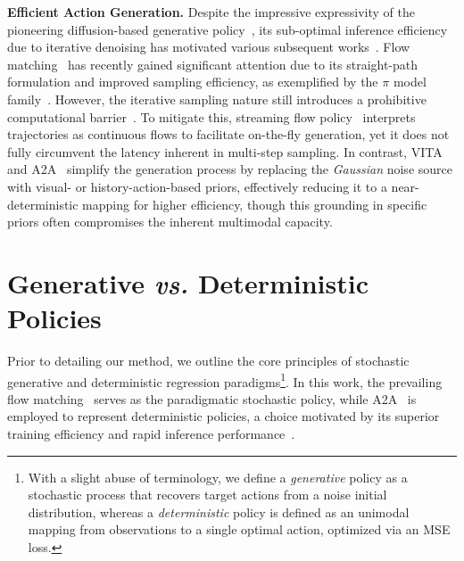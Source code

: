 \textbf{Efficient Action Generation.}
Despite the impressive expressivity of the pioneering diffusion-based generative policy~\citep{dp}, its sub-optimal inference efficiency due to iterative denoising has motivated various subsequent works~\citep{gao2025vita, jia2026action, bai2026flash}. Flow matching~\citep{flowmatching, zhang2025flowpolicy, fang2025omp, li2026ofp} has recently gained significant attention due to its straight-path formulation and improved sampling efficiency, as exemplified by the $\pi$ model family~\citep{intelligence2025pi,intelligence2025pi05, black2024pi_0}. However, the iterative sampling nature still introduces a prohibitive computational barrier~\citep{dp, pan2025much}. To mitigate this, streaming flow policy~\citep{jiang2025streaming} interprets trajectories as continuous flows to facilitate on-the-fly generation, yet it does not fully circumvent the latency inherent in multi-step sampling. In contrast, VITA~\citep{gao2025vita} and A2A~\citep{jia2026action} simplify the generation process by replacing the \textit{Gaussian} noise source with visual- or history-action-based priors, effectively reducing it to a near-deterministic mapping for higher efficiency, though this grounding in specific priors often compromises the inherent multimodal capacity.




\section{Generative \textit{vs.} Deterministic Policies}

Prior to detailing our method, we outline the core principles of stochastic generative and deterministic regression paradigms\footnote{With a slight abuse of terminology, we define a \textit{generative} policy as a stochastic process that recovers target actions from a noise initial distribution, whereas a \textit{deterministic} policy is defined as an unimodal mapping from observations to a single optimal action, optimized via an MSE loss.}. In this work, the prevailing flow matching~\citep{flowmatching, zhang2025flowpolicy, fang2025omp, li2026ofp} serves as the paradigmatic stochastic policy, while A2A~\citep{jia2026action} is employed to represent deterministic policies, a choice motivated by its superior training efficiency and rapid inference performance~\citep{bai2026flash}.


